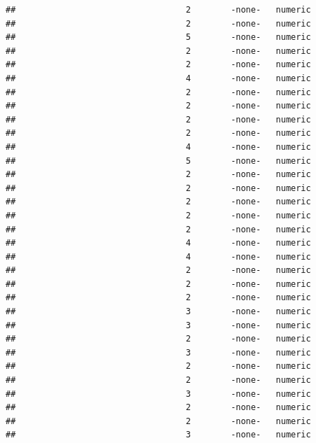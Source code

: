 \documentclass[
  12pt,
]{article}
\begin{document}
\begin{verbatim}
##                                  2        -none-   numeric                    
##                                  2        -none-   numeric                    
##                                  5        -none-   numeric                    
##                                  2        -none-   numeric                    
##                                  2        -none-   numeric                    
##                                  4        -none-   numeric                    
##                                  2        -none-   numeric                    
##                                  2        -none-   numeric                    
##                                  2        -none-   numeric                    
##                                  2        -none-   numeric                    
##                                  4        -none-   numeric                    
##                                  5        -none-   numeric                    
##                                  2        -none-   numeric                    
##                                  2        -none-   numeric                    
##                                  2        -none-   numeric                    
##                                  2        -none-   numeric                    
##                                  2        -none-   numeric                    
##                                  4        -none-   numeric                    
##                                  4        -none-   numeric                    
##                                  2        -none-   numeric                    
##                                  2        -none-   numeric                    
##                                  2        -none-   numeric                    
##                                  3        -none-   numeric                    
##                                  3        -none-   numeric                    
##                                  2        -none-   numeric                    
##                                  3        -none-   numeric                    
##                                  2        -none-   numeric                    
##                                  2        -none-   numeric                    
##                                  3        -none-   numeric                    
##                                  2        -none-   numeric                    
##                                  2        -none-   numeric                    
##                                  3        -none-   numeric                    

\end{verbatim}
\end{document}
